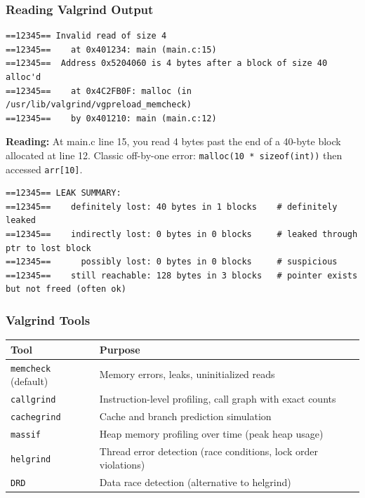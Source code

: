 \documentclass[11pt,a4paper]{article}
\newcommand{\code}[1]{\texttt{\small\colorbox{codebg}{\color{codekw}#1}}}
\begin{document}
\subsubsection{Reading Valgrind Output}

\begin{lstlisting}[style=bashstyle]
==12345== Invalid read of size 4
==12345==    at 0x401234: main (main.c:15)
==12345==  Address 0x5204060 is 4 bytes after a block of size 40 alloc'd
==12345==    at 0x4C2FB0F: malloc (in /usr/lib/valgrind/vgpreload_memcheck)
==12345==    by 0x401210: main (main.c:12)
\end{lstlisting}
\textbf{Reading:} At main.c line 15, you read 4 bytes past the end of a 40-byte block allocated at line 12. Classic off-by-one error: \code{malloc(10 * sizeof(int))} then accessed \code{arr[10]}.

\begin{lstlisting}[style=bashstyle]
==12345== LEAK SUMMARY:
==12345==    definitely lost: 40 bytes in 1 blocks    # definitely leaked
==12345==    indirectly lost: 0 bytes in 0 blocks     # leaked through ptr to lost block
==12345==      possibly lost: 0 bytes in 0 blocks     # suspicious
==12345==    still reachable: 128 bytes in 3 blocks   # pointer exists but not freed (often ok)
\end{lstlisting}

\subsubsection{Valgrind Tools}

\begin{center}
\begin{tabular}{L{4cm} L{9cm}}
\toprule
\textbf{Tool} & \textbf{Purpose} \\
\midrule
\code{memcheck} (default) & Memory errors, leaks, uninitialized reads \\
\code{callgrind} & Instruction-level profiling, call graph with exact counts \\
\code{cachegrind} & Cache and branch prediction simulation \\
\code{massif} & Heap memory profiling over time (peak heap usage) \\
\code{helgrind} & Thread error detection (race conditions, lock order violations) \\
\code{DRD} & Data race detection (alternative to helgrind) \\
\bottomrule
\end{tabular}
\end{center}
\end{document}

